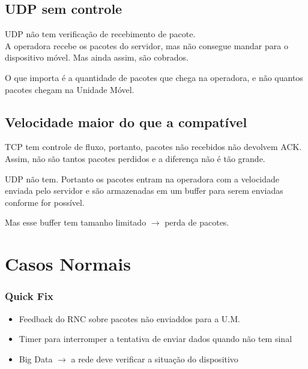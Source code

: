 \documentclass[brazil]{beamer}
\begin{document}
\subsection{UDP sem controle}

\begin{frame}[fragile]
    UDP não tem verificação de recebimento de pacote. \\
    A operadora recebe os pacotes do servidor, mas não consegue mandar para o dispositivo móvel. Mas ainda assim, são cobrados.
\end{frame}

\begin{frame}[fragile]
    O que importa é a quantidade de pacotes que chega na operadora, e não quantos pacotes chegam na Unidade Móvel.
\end{frame}

\subsection{Velocidade maior do que a compatível}

\begin{frame}[fragile]
    TCP tem controle de fluxo, portanto, pacotes não recebidos não devolvem ACK. Assim, não são tantos pacotes perdidos e a diferença não é tão grande.
    
\end{frame}

\begin{frame}[fragile]
    UDP não tem. Portanto os pacotes entram na operadora com a velocidade enviada pelo servidor e são armazenadas em um buffer para serem enviadas conforme for possível. 

    \vspace{0.3cm}
    Mas esse buffer tem tamanho limitado $\rightarrow$ perda de pacotes.
\end{frame}

\section{Casos Normais}



\begin{frame}[fragile]
        \frametitle{Quick Fix}
        \begin{itemize}
            \item Feedback do RNC sobre pacotes não enviaddos para a U.M.
            \item Timer para interromper a tentativa de enviar dados quando não tem sinal
            \item Big Data $\rightarrow$ a rede deve verificar a situação do dispositivo
        \end{itemize}
\end{frame}
\end{document}
